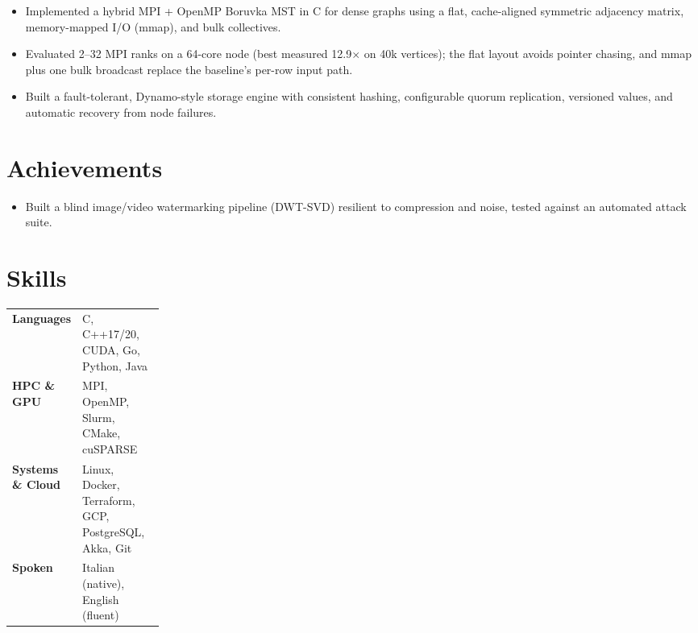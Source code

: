\projectdivider

\begin{itemize}[nosep, after=\strut, leftmargin=1.5em, itemsep=1pt, label=\color{accent}\textbullet]
    \item Implemented a hybrid MPI + OpenMP Boruvka MST in C for dense graphs using a flat, cache-aligned symmetric adjacency matrix, memory-mapped I/O (mmap), and bulk collectives.
    \item Evaluated 2--32 MPI ranks on a 64-core node (best measured 12.9$\times$ on 40k vertices); the flat layout avoids pointer chasing, and mmap plus one bulk broadcast replace the baseline's per-row input path.
\end{itemize}

\projectdivider

\begin{itemize}[nosep, after=\strut, leftmargin=1.5em, itemsep=1pt, label=\color{accent}\textbullet]
    \item Built a fault-tolerant, Dynamo-style storage engine with consistent hashing, configurable quorum replication, versioned values, and automatic recovery from node failures.
\end{itemize}

\section{Achievements}
\begin{itemize}[nosep, after=\strut, leftmargin=1.5em, itemsep=1pt, label=\color{accent}\textbullet]
    \item Built a blind image/video watermarking pipeline (DWT-SVD) resilient to compression and noise, tested against an automated attack suite.
\end{itemize}

\section{Skills}
\small
\begin{tabularx}{\linewidth}{@{}p{0.22\linewidth} X@{}}
\textbf{Languages} & C, C++17/20, CUDA, Go, Python, Java \\
\textbf{HPC \& GPU} & MPI, OpenMP, Slurm, CMake, cuSPARSE \\
\textbf{Systems \& Cloud} & Linux, Docker, Terraform, GCP, PostgreSQL, Akka, Git \\
\textbf{Spoken} & Italian (native), English (fluent) \\
\end{tabularx}


